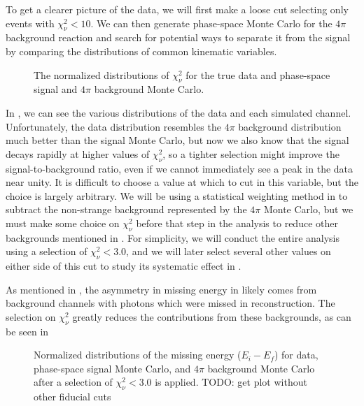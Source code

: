 To get a clearer picture of the data, we will first make a loose cut selecting only events with $\chi^2_\nu < 10$. We can then generate phase-space Monte Carlo for the $4\pi$ background reaction and search for potential ways to separate it from the signal by comparing the distributions of common kinematic variables.

\begin{figure}
  \begin{center}
    
  \end{center}
  \caption{The normalized distributions of $\chi^2_\nu$ for the true data and phase-space signal and $4\pi$ background Monte Carlo.}\label{fig:data-combined-chisqdof}
\end{figure}

In , we can see the various distributions of the data and each simulated channel. Unfortunately, the data distribution resembles the $4\pi$ background distribution much better than the signal Monte Carlo, but now we also know that the signal decays rapidly at higher values of $\chi^2_\nu$, so a tighter selection might improve the signal-to-background ratio, even if we cannot immediately see a peak in the data near unity. It is difficult to choose a value at which to cut in this variable, but the choice is largely arbitrary. We will be using a statistical weighting method in  to subtract the non-strange background represented by the $4\pi$ Monte Carlo, but we must make some choice on $\chi^2_\nu$ before that step in the analysis to reduce other backgrounds mentioned in . For simplicity, we will conduct the entire analysis using a selection of $\chi^2_\nu < 3.0$, and we will later select several other values on either side of this cut to study its systematic effect in .

As mentioned in , the asymmetry in missing energy in  likely comes from background channels with photons which were missed in reconstruction. The selection on $\chi^2_\nu$ greatly reduces the contributions from these backgrounds, as can be seen in 

\begin{figure}
  \begin{center}
    
  \end{center}
  \caption{Normalized distributions of the missing energy ($E_i - E_f$) for data, phase-space signal Monte Carlo, and $4\pi$ background Monte Carlo after a selection of $\chi^2_\nu < 3.0$ is applied. {\color{red}TODO: get plot without other fiducial cuts}}\label{fig:me-combined-chisqdof-3.0}
\end{figure}


